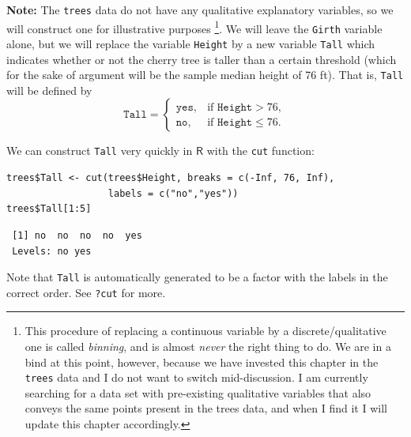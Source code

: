 \documentclass[captions=tableheading]{scrbook}
\begin{document}
\textbf{Note:}
The \texttt{trees} data do not have any qualitative explanatory variables, so we will construct one for illustrative purposes
\footnote{This procedure of replacing a continuous variable by a discrete/qualitative one is called \emph{binning}, and is almost \emph{never} the right thing to do. We are in a bind at this point, however, because we have invested this chapter in the \texttt{trees} data and I do not want to switch mid-discussion. I am currently searching for a data set with pre-existing qualitative variables that also conveys the same points present in the trees data, and when I find it I will update this chapter accordingly.}.
We will leave the \texttt{Girth} variable alone, but we will replace the variable \texttt{Height} by a new variable \texttt{Tall} which indicates whether or not the cherry tree is taller than a certain threshold (which for the sake of argument will be the sample median height of 76 ft). That is, \texttt{Tall} will be defined by
\begin{equation}
\mathtt{Tall}=
\begin{cases}
\mathtt{yes}, & \mbox{if }\mathtt{Height}>76,\\
\mathtt{no}, & \mbox{if }\mathtt{Height}\leq76.
\end{cases}
\end{equation}

We can construct \texttt{Tall} very quickly in \(\mathsf{R}\) with the \texttt{cut} function:


\begin{verbatim}
trees$Tall <- cut(trees$Height, breaks = c(-Inf, 76, Inf), 
                  labels = c("no","yes"))
trees$Tall[1:5]
\end{verbatim}

\begin{verbatim}
 [1] no  no  no  no  yes
 Levels: no yes
\end{verbatim}

Note that \texttt{Tall} is automatically generated to be a factor with the labels in the correct order. See \texttt{?cut} for more. 
\end{document}
